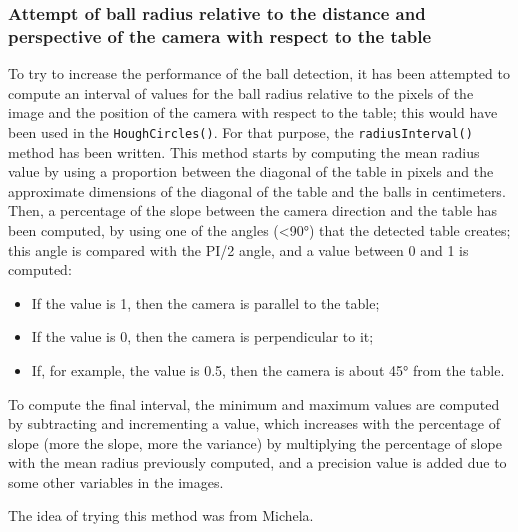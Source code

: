 \subsubsection{Attempt of ball radius relative to the distance and perspective of the camera with respect to the table}

To try to increase the performance of the ball detection, it has been attempted to compute an interval of values for the ball radius relative to the pixels of the image and the position of the camera with respect to the table; this would have been used in the \texttt{HoughCircles()}. For that purpose, the \texttt{radiusInterval()} method has been written. This method starts by computing the mean radius value by using a proportion between the diagonal of the table in pixels and the approximate dimensions of the diagonal of the table and the balls in centimeters. Then, a percentage of the slope between the camera direction and the table has been computed, by using one of the angles (<90°) that the detected table creates; this angle is compared with the PI/2 angle, and a value between 0 and 1 is computed:

\begin{itemize}
	\item If the value is 1, then the camera is parallel to the table;
	\item If the value is 0, then the camera is perpendicular to it;
	\item If, for example, the value is 0.5, then the camera is about 45° from the table.
\end{itemize}
	
To compute the final interval, the minimum and maximum values are computed by subtracting and incrementing a value, which increases with the percentage of slope (more the slope, more the variance) by multiplying the percentage of slope with the mean radius previously computed, and a precision value is added due to some other variables in the images.\

The idea of trying this method was from Michela.
